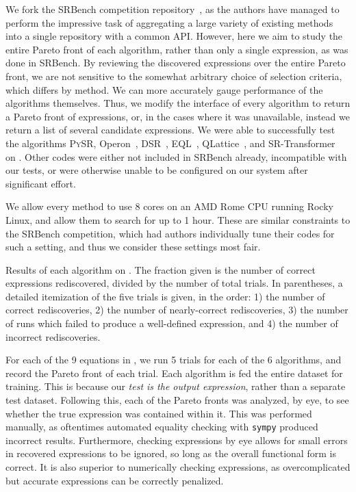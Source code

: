 \documentclass[letterpaper,twocolumn]{scrartcl}
\newcommand\pysr{\textsc{PySR}\xspace}
\begin{document}
\begin{linenumbers}
We fork the SRBench competition repository~\cite{defrancaInterpretableSymbolicRegression2023}, as the authors have managed to perform the impressive task of aggregating a large variety of existing methods into a single repository with a common API.
However, here we aim to study the entire Pareto front of each algorithm, rather than only a single expression, as was done in SRBench.
By reviewing the discovered expressions over the entire Pareto front, we are not sensitive to the somewhat arbitrary choice of selection criteria, which differs by method. 
We can more accurately gauge performance of the algorithms themselves.
Thus, we modify the interface of every algorithm to return a Pareto front of expressions, or, in the cases where it was unavailable, instead we return a list of several candidate expressions.
We were able to successfully test the algorithms \pysr, Operon~\cite{burlacuOperonEfficientGenetic2020}, DSR~\cite{petersenDeepSymbolicRegression2021}, EQL~\cite{sahooLearningEquationsExtrapolation2018}, QLattice~\cite{brolosApproachSymbolicRegression2021}, and SR-Transformer~\cite{kamiennyEndtoendSymbolicRegression2022} on \bench.
Other codes were either not included in SRBench already, incompatible with our tests, or were otherwise unable to be configured on our system after significant effort.

We allow every method to use 8 cores on an AMD Rome CPU running Rocky Linux, and allow them to search for up to 1 hour.
These are similar constraints to the SRBench competition, which had authors individually tune their codes for such a setting, and thus we consider these settings most fair.

\begin{table*}[h!]
    \centering
    \caption{Results of each algorithm on \bench.
    The fraction given is the number of correct expressions rediscovered, divided by the number of total trials.
    In parentheses, a detailed itemization of the five trials is given, in the order: 1) the number of correct rediscoveries, 2) the number of nearly-correct rediscoveries, 3) the number of runs which failed to produce a well-defined expression, and 4) the number of incorrect rediscoveries.
    }
    \label{tab:results}
\end{table*}

For each of the 9 equations in \bench, we run 5 trials for each of the 6 algorithms, and record the Pareto front of each trial.
Each algorithm is fed the entire dataset for training.
This is because our \textit{test is the output expression}, rather than a separate test dataset.
Following this, each of the Pareto fronts was analyzed, by eye, to see whether the true expression was contained within it.
This was performed manually, as oftentimes automated equality checking with \texttt{sympy} produced incorrect results.
Furthermore, checking expressions by eye allows for small errors in recovered expressions to be ignored, so long as the overall functional form is correct.
It is also superior to numerically checking expressions, as overcomplicated but accurate expressions can be correctly penalized.


\end{linenumbers}
\end{document}

